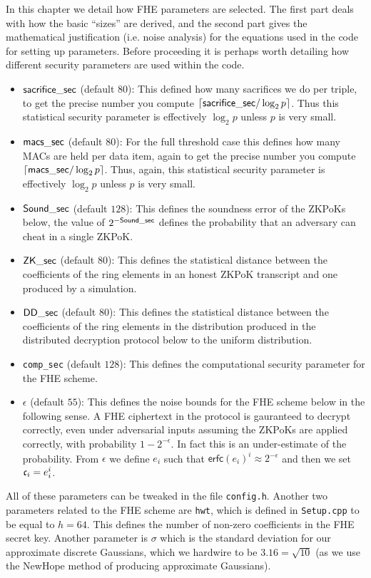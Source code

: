 \label{sec:fhe}
In this chapter we detail how FHE parameters are selected.
The first part deals with how the basic ``sizes'' are derived,
and the second part gives the mathematical justification (i.e.
noise analysis) for the equations used in the code for setting
up parameters.
Before proceeding it is perhaps worth detailing how
different security parameters are used within the code.

\begin{itemize}
\item $\mathsf{sacrifice\_sec}$ (default $80$): 
This defined how many sacrifices we do per triple, 
to get the precise number you compute ${\lceil \mathsf{sacrifice\_sec}/\log_2 p \rceil}$.
Thus this statistical security parameter is effectively
$\log_2 p$ unless $p$ is very small.
\item $\mathsf{macs\_sec}$ (default $80$):
For the full threshold case this defines how many MACs are held
per data item, again to get the precise number you compute 
${\lceil \mathsf{macs\_sec}/\log_2 p \rceil}$.
Thus, again, this statistical security parameter is effectively
$\log_2 p$ unless $p$ is very small.
\item $\mathsf{Sound\_sec}$ (default $128$):
This defines the soundness error of the ZKPoKs below,
the value of $2^{-\mathsf{Sound\_sec}}$ defines the probability
that an adversary can cheat in a single ZKPoK.
\item $\mathsf{ZK\_sec}$ (default $80$): 
This defines the statistical distance between the 
coefficients of the ring elements in an honest ZKPoK
transcript and one produced by a simulation.
\item $\mathsf{DD\_sec}$ (default $80$):
This defines the statistical distance between the 
coefficients of the ring elements in the distribution produced
in the distributed decryption protocol below to the uniform
distribution.
\item \verb+comp_sec+ (default $128$):
This defines the computational security parameter for the
FHE scheme. 
\item $\epsilon$ (default $55$):
This defines the noise bounds for the FHE scheme below in
the following sense.
A FHE ciphertext in the protocol is gauranteed to decrypt
correctly, even under adversarial inputs assuming the
ZKPoKs are applied correctly, with probability $1-2^{-\epsilon}$.
In fact this is an under-estimate of the probability.
From $\epsilon$ we define $e_i$ such that 
$\mathsf{erfc}(e_i)^i \approx 2^{-\epsilon}$ and then we set $\mathfrak{c}_i = e_i^i$.
\end{itemize}
All of these parameters can be tweaked in the file
\verb+config.h+.
Another two parameters related to the FHE scheme are
\verb+hwt+, which is defined in \verb+Setup.cpp+ to
be equal to $h=64$.
This defines the number of non-zero coefficients in the
FHE secret key.
Another parameter is $\sigma$ which is the standard deviation
for our approximate discrete Gaussians, which we
hardwire to be $3.16 = \sqrt{10}$ (as we use the NewHope method
of producing approximate Gaussians).

